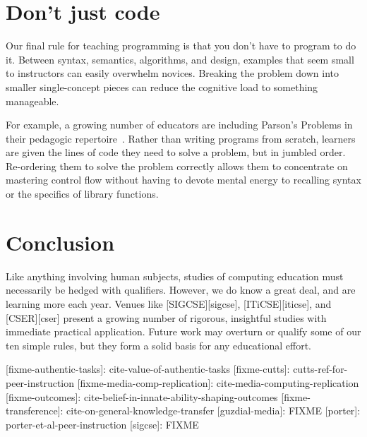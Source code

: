 \documentclass{article}
\begin{document}
\section{Don't just code}

Our final rule for teaching programming is that you don't have to program to do it.
Between syntax, semantics, algorithms, and design,
examples that seem small to instructors can easily overwhelm novices.
Breaking the problem down into smaller single-concept pieces can reduce the cognitive load to something manageable.

For example,
a growing number of educators are including Parson's Problems in their pedagogic repertoire~\citep{parsons,morrison-parsons}.
Rather than writing programs from scratch,
learners are given the lines of code they need to solve a problem,
but in jumbled order.
Re-ordering them to solve the problem correctly allows them to concentrate on mastering control flow
without having to devote mental energy to recalling syntax
or the specifics of library functions.

\section*{Conclusion}

Like anything involving human subjects,
studies of computing education must necessarily be hedged with qualifiers.
However,
we do know a great deal,
and are learning more each year.
Venues like [SIGCSE][sigcse],
[ITiCSE][iticse],
and [CSER][cser]
present a growing number of rigorous, insightful studies
with immediate practical application.
Future work may overturn or qualify some of our ten simple rules,
but they form a solid basis for any educational effort.

[fixme-authentic-tasks]: cite-value-of-authentic-tasks
[fixme-cutts]: cutts-ref-for-peer-instruction
[fixme-media-comp-replication]: cite-media-computing-replication
[fixme-outcomes]: cite-belief-in-innate-ability-shaping-outcomes
[fixme-transference]: cite-on-general-knowledge-transfer
[guzdial-media]: FIXME
[porter]: porter-et-al-peer-instruction
[sigcse]: FIXME



\end{document}
